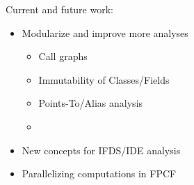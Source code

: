 \documentclass{beamer}
\begin{document}
\begin{frame}
Current and future work:
\begin{itemize}
	\item Modularize and improve more analyses\\ 
	\begin{itemize}
		\item Call graphs
		\item Immutability of Classes/Fields
		\item Points-To/Alias analysis
		\item \textellipsis
	\end{itemize}
	\item New concepts for IFDS/IDE analysis
	\item Parallelizing computations in FPCF
\end{itemize}
\end{frame}
\end{document}
